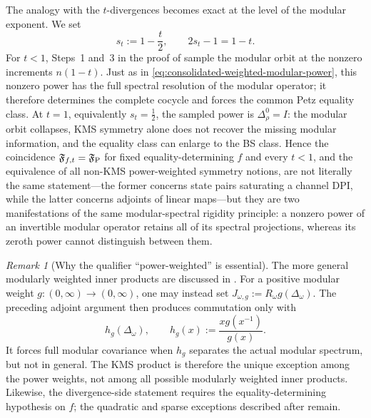 \documentclass[11pt]{article}
\theoremstyle{remark}
\newtheorem{remark}[remark]{Remark}
\newcommand{\1}{\mathbbm{1}}
\begin{document}
The analogy with the $t$-divergences becomes exact at the level of
the modular exponent.  We set
\begin{equation}
 s_t:=1-\frac t2,
 \qquad 2s_t-1=1-t.
 \label{eq:consolidated-t-weighted-parameter}
\end{equation}
For $t<1$, Steps~1 and~3 in the proof of
 sample the modular orbit at
the nonzero increments $n(1-t)$.  Just as in
\eqref{eq:consolidated-weighted-modular-power}, this nonzero power
has the full spectral resolution of the modular operator; it
therefore determines the complete cocycle and forces the common Petz
equality class.  At $t=1$, equivalently $s_t=\frac12$, the sampled
power is $\Delta_\rho^0=I$: the modular orbit collapses, KMS symmetry alone
does not recover the missing modular information, and the equality
class can enlarge to the BS class.  Hence the coincidence
$\mathfrak F_{f,t}=\mathfrak F_{\rm P}$ for fixed
equality-determining $f$ and every $t<1$, and the equivalence of all
non-KMS power-weighted symmetry notions, are not literally the same
statement---the former concerns state pairs saturating a channel
DPI, while the latter concerns adjoints of linear maps---but they are
two manifestations of the same modular-spectral rigidity principle:
a nonzero power of an invertible modular operator retains all of its
spectral projections, whereas its zeroth power cannot distinguish
between them.

\begin{remark}[Why the qualifier ``power-weighted'' is essential]
The more general modularly weighted inner products are discussed in
\cite[Section~2.2]{carlen2017gradient}.  For a positive modular weight
$g:(0,\infty)\to(0,\infty)$, one may instead set
$J_{\omega,g}:=R_\omega g(\Delta_\omega)$.  The preceding adjoint
argument then produces commutation only with
\begin{equation}
 h_g(\Delta_\omega),
 \qquad
 h_g(x):=\frac{xg(x^{-1})}{g(x)}.
\end{equation}
It forces full modular covariance when $h_g$ separates the actual
modular spectrum, but not in general.  The KMS product is therefore
the unique exception among the power weights, not among all possible
modularly weighted inner products.  Likewise, the divergence-side
statement requires the equality-determining hypothesis on $f$; the
quadratic and sparse exceptions described after
 remain.
\end{remark}
\end{document}
